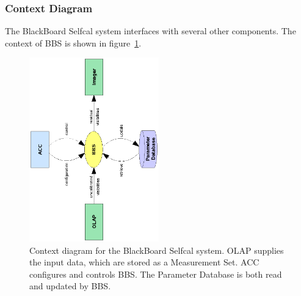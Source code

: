 \documentclass[10pt]{lofar}
\begin{document}
\subsubsection{Context Diagram}
\label{subsubsec:context}
The BlackBoard Selfcal system interfaces with several other components. The
context of BBS is shown in figure~\ref{fig:bbs-context-diagram}.

\begin{figure}[!ht]
\centering
\includegraphics[width=0.5\textwidth,angle=-90]{images/bbs-context-diagram}
\caption{Context diagram for the BlackBoard Selfcal system. OLAP supplies the
input data, which are stored as a Measurement Set. ACC configures and controls
BBS. The Parameter Database
is both read and updated by BBS.}
\label{fig:bbs-context-diagram}
\end{figure}
\end{document}
